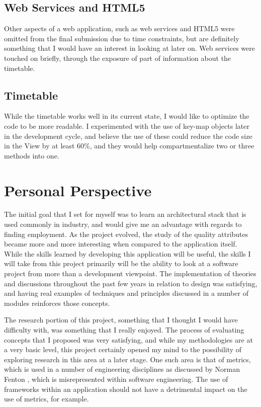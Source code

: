 \subsection{Web Services and HTML5}
Other aspects of a web application, such as web services and HTML5 were omitted from the final submission due to time constraints, but are definitely something that I would have an interest in looking at later on. Web services were touched on briefly, through the exposure of part of information about the timetable. 

\subsection{Timetable}
While the timetable works well in its current state, I would like to optimize the code to be more readable. I experimented with the use of key-map objects later in the development cycle, and believe the use of these could reduce the code size in the View by at least 60\%, and they would help compartmentalize two or three methods into one.

\section{Personal Perspective}

The initial goal that I set for myself was to learn an architectural stack that is used commonly in industry, and would give me an advantage with regards to finding employment. As the project evolved, the study of the quality attributes became more and more interesting when compared to the application itself. While the skills learned by developing this application will be useful, the skills I will take from this project primarily will be the ability to look at a software project from more than a development viewpoint. The implementation of theories and discussions throughout the past few years in relation to design was satisfying, and having real examples of techniques and principles discussed in a number of modules reinforces those concepts.

The research portion of this project, something that I thought I would have difficulty with, was something that I really enjoyed. The process of evaluating concepts that I proposed was very satisfying, and while my methodologies are at a very basic level, this project certainly opened my mind to the possibility of exploring research in this area at a later stage. One such area is that of metrics, which is used in a number of engineering disciplines as discussed by Norman Fenton \parencite{softmetrics}, which is misrepresented within software engineering. The use of frameworks within an application should not have a detrimental impact on the use of metrics, for example. 

 